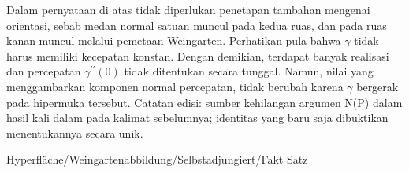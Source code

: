 Dalam pernyataan di atas tidak diperlukan penetapan tambahan mengenai orientasi, sebab medan normal satuan muncul pada kedua ruas, dan pada ruas kanan muncul melalui pemetaan Weingarten. Perhatikan pula bahwa $\gamma$ tidak harus memiliki kecepatan konstan. Dengan demikian, terdapat banyak realisasi dan percepatan $\gamma^{\prime \prime} (0)$ tidak ditentukan secara tunggal. Namun, nilai
 yang menggambarkan komponen normal percepatan, tidak berubah karena $\gamma$ bergerak pada hipermuka tersebut.
Catatan edisi: sumber kehilangan argumen N(P) dalam hasil kali dalam pada kalimat sebelumnya; identitas yang baru saja dibuktikan menentukannya secara unik.



{Hyperfläche/Weingartenabbildung/Selbstadjungiert/Fakt}
{Satz}
{}
{

\faktzusatz {}
\faktzusatz {}

}

